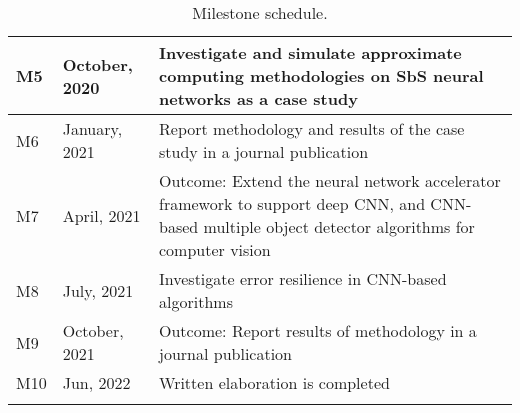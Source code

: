 \begin{longtable}{|l|l|m{9cm}|}
		M5                 & October, 2020   & Investigate and simulate approximate computing methodologies on SbS neural networks as a case study                                                                                                                                                                                                                             \\ \hline
		M6                 & January, 2021   & Report methodology and results of the case study in a journal publication
		\\ \hline
		M7                 & April, 2021     & Outcome: Extend the neural network accelerator framework to support deep CNN, and CNN-based multiple object detector algorithms for computer vision                                                                                                                                                                                                                                                                                                                       \\ \hline
		M8                 & July, 2021      & Investigate error resilience in CNN-based algorithms                                                                                                                                                                                                                                                                                                                                        \\ \hline
		M9                 & October, 2021   & Outcome: Report results of methodology in a journal publication                                                                                                                                                                                                                                                                                                                                                                                          \\ \hline
		M10                & Jun, 2022       & Written elaboration is completed                                                                                                                                                                                                                                                                                                                                                                                                                                                    \\ \hline
		\caption{Milestone schedule.}\label{tab:mileston_schedule}
	\end{longtable}
